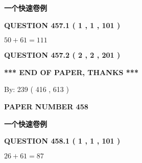 \documentclass{ctexart}
\begin{document}
   
   
   
 \vspace{0.2in}
{\LARGE {\textbf{ 一个快速卷例}}}
   
   
  
\vspace{0.2in}
  
{\textbf{\Large{QUESTION
457.1 
 ( 1 , 1 , 101 )
}}}
  
  
 
 

$ %
50 +  %
61=   %
111$
 
 
  
\vspace{0.2in}
  
{\textbf{\Large{QUESTION
457.2 
 ( 2 , 2 , 201 )
}}}
  
  
   
   
 \vspace{0.2in}
 
   
   
   
   
\vspace{1.0in} 
{\textbf{\large{ *** END OF PAPER, THANKS *** }}} 
   
   
\hspace{1.0in} By: 
 239 ( 416 ,  613 )
   
   
   
   
\newpage 
\setcounter{page}{ 
   458001 } 
   
   
   
   
 {\textbf{ \Large{ PAPER NUMBER  458  }}}
   
   
\vspace{0.2in}
   
   
   
   
   
   
 \vspace{0.2in}
{\LARGE {\textbf{ 一个快速卷例}}}
   
   
  
\vspace{0.2in}
  
{\textbf{\Large{QUESTION
458.1 
 ( 1 , 1 , 101 )
}}}
  
  
 
 

$ %
26 +  %
61=   %
87$
 
 
  
\vspace{0.2in}
  
\end{document}
